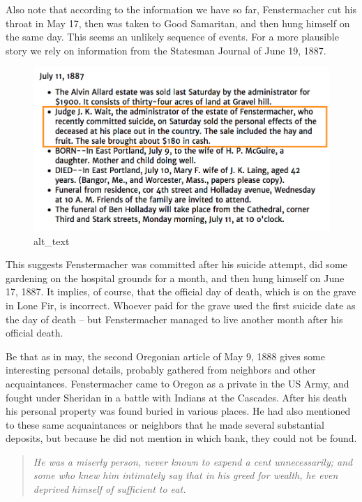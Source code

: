 \documentclass[
  12pt,
]{book}
\begin{document}
Also note that according to the information we have so far, Fenstermacher cut his throat in May 17, then was taken to Good Samaritan, and then hung himself on the same day. This seems an unlikely sequence of events. For a more plausible story we rely on information from the Statesman Journal of June 19, 1887.

\begin{figure}
\centering
\includegraphics{images/0204b_images/image3.png}
\caption{alt\_text}
\end{figure}

This suggests Fenstermacher was committed after his suicide attempt, did some gardening on the hospital grounds for a month, and then hung himself on June 17, 1887. It implies, of course, that the official day of death, which is on the grave in Lone Fir, is incorrect. Whoever paid for the grave used the first suicide date as the day of death -- but Fenstermacher managed to live another month after his official death.

Be that as in may, the second Oregonian article of May 9, 1888 gives some interesting personal details, probably gathered from neighbors and other acquaintances. Fenstermacher came to Oregon as a private in the US Army, and fought under Sheridan in a battle with Indians at the Cascades. After his death his personal property was found buried in various places. He had also mentioned to these same acquaintances or neighbors that he made several substantial deposits, but because he did not mention in which bank, they could not be found.

\begin{quote}
\emph{He was a miserly person, never known to expend a cent unnecessarily; and some who knew him intimately say that in his greed for wealth, he even deprived himself of sufficient to eat.}
\end{quote}
\end{document}
